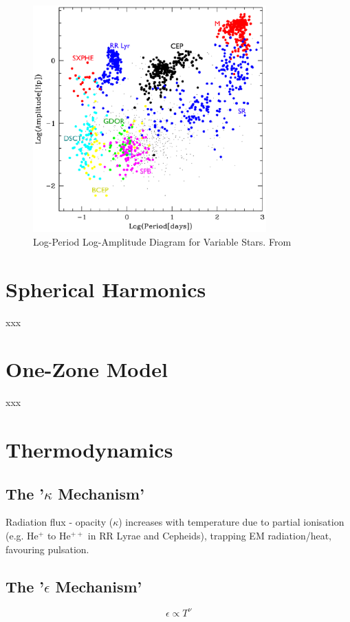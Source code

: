 \documentclass{spy}
\begin{document}
\begin{figure}[ht]
    \centering
    \includegraphics[width=0.8\textwidth]{period_amplitude.eps}
    \caption{Log-Period Log-Amplitude Diagram for Variable Stars. From \citet{eyerVariableStarsObservational2008}}
    \label{period_amp_diagram}
\end{figure}

\section{Spherical Harmonics}
xxx

\section{One-Zone Model}
xxx

\section{Thermodynamics}
\subsection{The '\(\kappa\) Mechanism'}
Radiation flux - opacity (\(\kappa\)) increases with temperature due to partial ionisation (e.g. He\(^+\) to He\(^{++}\) in RR Lyrae and Cepheids), trapping EM radiation/heat, favouring pulsation. 

\subsection{The '\(\epsilon\) Mechanism'}
\begin{equation}
\epsilon \propto T^\nu
\end{equation}
\end{document}
